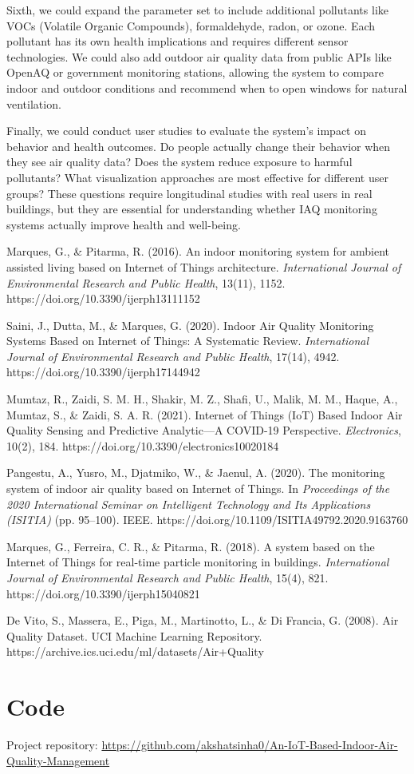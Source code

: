 \documentclass[12pt]{report}
\begin{document}
Sixth, we could expand the parameter set to include additional pollutants like VOCs (Volatile Organic Compounds), formaldehyde, radon, or ozone. Each pollutant has its own health implications and requires different sensor technologies. We could also add outdoor air quality data from public APIs like OpenAQ or government monitoring stations, allowing the system to compare indoor and outdoor conditions and recommend when to open windows for natural ventilation.

Finally, we could conduct user studies to evaluate the system's impact on behavior and health outcomes. Do people actually change their behavior when they see air quality data? Does the system reduce exposure to harmful pollutants? What visualization approaches are most effective for different user groups? These questions require longitudinal studies with real users in real buildings, but they are essential for understanding whether IAQ monitoring systems actually improve health and well-being.

\begin{thebibliography}{9}
Marques, G., \& Pitarma, R. (2016). An indoor monitoring system for ambient assisted living based on Internet of Things architecture. \emph{International Journal of Environmental Research and Public Health}, 13(11), 1152. https://doi.org/10.3390/ijerph13111152

Saini, J., Dutta, M., \& Marques, G. (2020). Indoor Air Quality Monitoring Systems Based on Internet of Things: A Systematic Review. \emph{International Journal of Environmental Research and Public Health}, 17(14), 4942. https://doi.org/10.3390/ijerph17144942

Mumtaz, R., Zaidi, S. M. H., Shakir, M. Z., Shafi, U., Malik, M. M., Haque, A., Mumtaz, S., \& Zaidi, S. A. R. (2021). Internet of Things (IoT) Based Indoor Air Quality Sensing and Predictive Analytic—A COVID-19 Perspective. \emph{Electronics}, 10(2), 184. https://doi.org/10.3390/electronics10020184

Pangestu, A., Yusro, M., Djatmiko, W., \& Jaenul, A. (2020). The monitoring system of indoor air quality based on Internet of Things. In \emph{Proceedings of the 2020 International Seminar on Intelligent Technology and Its Applications (ISITIA)} (pp. 95--100). IEEE. https://doi.org/10.1109/ISITIA49792.2020.9163760

Marques, G., Ferreira, C. R., \& Pitarma, R. (2018). A system based on the Internet of Things for real-time particle monitoring in buildings. \emph{International Journal of Environmental Research and Public Health}, 15(4), 821. https://doi.org/10.3390/ijerph15040821

De Vito, S., Massera, E., Piga, M., Martinotto, L., \& Di Francia, G. (2008). Air Quality Dataset. UCI Machine Learning Repository. https://archive.ics.uci.edu/ml/datasets/Air+Quality
\end{thebibliography}

\section{Code}
Project repository: \url{https://github.com/akshatsinha0/An-IoT-Based-Indoor-Air-Quality-Management}
\end{document}

